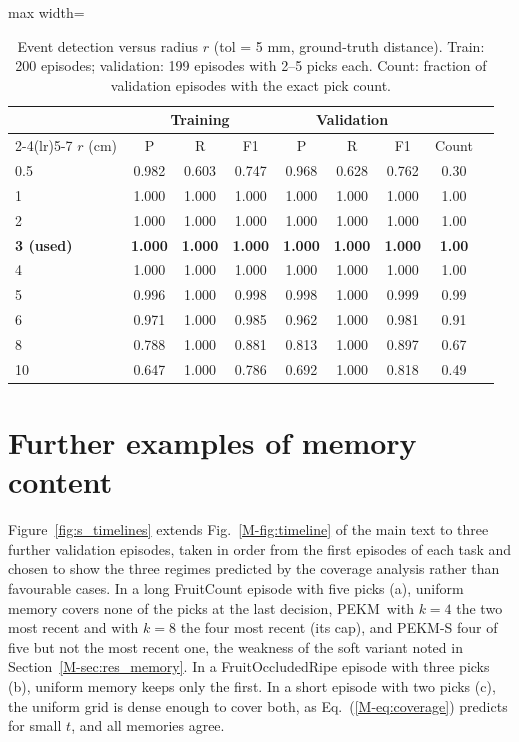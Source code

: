 \documentclass[preprint,12pt,authoryear]{elsarticle}
\newcommand{\mref}[1]{\ref*{M-#1}}
\newcommand{\pekm}{PEKM}
\begin{document}
\begin{table}[h]
\centering
\caption{Event detection versus radius $r$ (tol = 5 mm, ground-truth distance). Train: 200 episodes; validation: 199 episodes with 2--5 picks each. Count: fraction of validation episodes with the exact pick count.}
\label{tab:s_radius}
\small
\begin{adjustbox}{max width=\textwidth}\begin{tabular}{lcccccccc}
\toprule
 & \multicolumn{3}{c}{Training} & \multicolumn{3}{c}{Validation} & \\
\cmidrule(lr){2-4}\cmidrule(lr){5-7}
$r$ (cm) & P & R & F1 & P & R & F1 & Count\\
\midrule
0.5 & 0.982 & 0.603 & 0.747 & 0.968 & 0.628 & 0.762 & 0.30\\
1 & 1.000 & 1.000 & 1.000 & 1.000 & 1.000 & 1.000 & 1.00\\
2 & 1.000 & 1.000 & 1.000 & 1.000 & 1.000 & 1.000 & 1.00\\
\textbf{3 (used)} & \textbf{1.000} & \textbf{1.000} & \textbf{1.000} & \textbf{1.000} & \textbf{1.000} & \textbf{1.000} & \textbf{1.00}\\
4 & 1.000 & 1.000 & 1.000 & 1.000 & 1.000 & 1.000 & 1.00\\
5 & 0.996 & 1.000 & 0.998 & 0.998 & 1.000 & 0.999 & 0.99\\
6 & 0.971 & 1.000 & 0.985 & 0.962 & 1.000 & 0.981 & 0.91\\
8 & 0.788 & 1.000 & 0.881 & 0.813 & 1.000 & 0.897 & 0.67\\
10 & 0.647 & 1.000 & 0.786 & 0.692 & 1.000 & 0.818 & 0.49\\
\bottomrule
\end{tabular}\end{adjustbox}
\end{table}



\section{Further examples of memory content}
\label{sec:s_timelines}
Figure~\ref{fig:s_timelines} extends Fig.~\mref{fig:timeline} of the main text to three further validation episodes, taken in order from the first episodes of each task and chosen to show the three regimes predicted by the coverage analysis rather than favourable cases. In a long FruitCount episode with five picks (a), uniform memory covers none of the picks at the last decision, \pekm\ with $k=4$ the two most recent and with $k=8$ the four most recent (its cap), and PEKM-S four of five but not the most recent one, the weakness of the soft variant noted in Section~\mref{sec:res_memory}. In a FruitOccludedRipe episode with three picks (b), uniform memory keeps only the first. In a short episode with two picks (c), the uniform grid is dense enough to cover both, as Eq.~(\mref{eq:coverage}) predicts for small $t$, and all memories agree.
\end{document}
